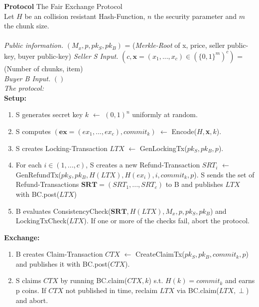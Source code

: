\documentclass{cacthesis}
\makeatletter
\newcounter{protocol}
\newenvironment{protocol}[1]
  {\par\addvspace{\topsep}
   \noindent
   \tabularx{\linewidth}{@{} X @{}}
    \hline
    \refstepcounter{protocol}\textbf{Protocol \theprotocol} #1 \\
    \hline}
  { \\
    \hline
   \endtabularx
   \par\addvspace{\topsep}}
\newcommand{\sbline}{\\[.5\normalbaselineskip]}%
\makeatother
\begin{document}
        \begin{protocol}{The Fair Exchange Protocol}
        Let $H$ be an collision resistant Hash-Function, $n$ the security parameter and $m$ the chunk size. \\
        \sbline
        \textit{Public information.} $(M_x, p, pk_S, pk_B)$ = (\textit{Merkle-Root} of x, price, seller public-key, buyer public-key)
        \textit{Seller S Input.} $(c, \textbf{x} = (x_1, ..., x_c) \in (\{0,1\}^m)^c)$ = (Number of chunks, item)
        \sbline
        \textit{Buyer B Input.} $()$
        \sbline
        \textit{The protocol:}
        \sbline
        \textbf{Setup:}
          \begin{enumerate}
            \item S generates secret key $k$ $\leftarrow$ $(0, 1)^n$ uniformly at random.
            
            \item S computes $(\textbf{ex} = (ex_1, ..., ex_c), commit_k)$ $\leftarrow$ \textsf{Encode($H, $}\textbf{x}\textsf{$, k$)}.
            
            \item S creates Locking-Transaction $LTX$ $\leftarrow$ \textsf{GenLockingTx($pk_S, pk_B, p$)}.
            
            \item For each $i \in (1, ..., c)$, S creates a new Refund-Transaction $SRT_i$ $\leftarrow$ \textsf{GenRefundTx($pk_S, pk_B, H(LTX), H(ex_i), i, commit_k, p$)}. S sends the set of Refund-Transactions $\textbf{SRT} = (SRT_1, ..., SRT_c)$ to B and publishes $LTX$ with \textsf{BC.post($LTX$)}
            
            \item B evaluates \textsf{ConsistencyCheck(}$\textbf{SRT}$\textsf{$, H(LTX), M_x, p, pk_S, pk_B$)} and \textsf{LockingTxCheck($LTX$)}. If one or more of the checks fail, abort the protocol.
          \end{enumerate}
          
          \textbf{Exchange:}
          \begin{enumerate}
            \item B creates Claim-Transaction $CTX$ $\leftarrow$ \textsf{CreateClaimTx($pk_S, pk_B, commit_k, p$)} and publishes it with \textsf{BC.post($CTX$)}.
            
            \item S claims $CTX$ by running \textsf{BC.claim($CTX, k$)} s.t. $H(k) = commit_k$ and earns p coins. If $CTX$ not published in time, reclaim $LTX$ via \textsf{BC.claim($LTX, \perp$)} and abort. 
          \end{enumerate}
          

\end{protocol}
\end{document}
